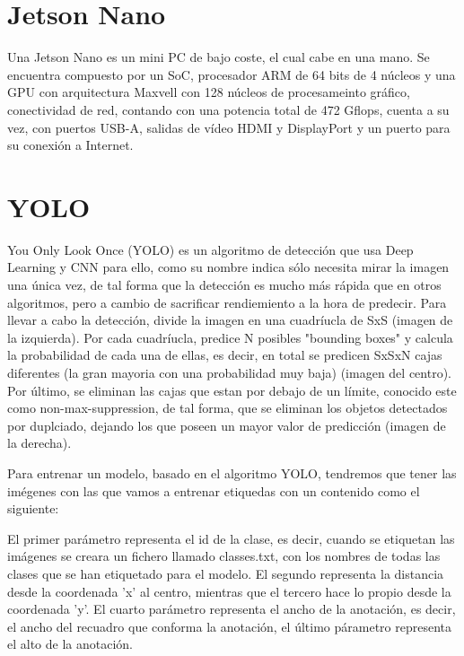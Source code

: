 
\section{Jetson Nano}

Una Jetson Nano \cite{jetsonNano} es un mini PC de bajo coste, el cual cabe en una mano. Se encuentra compuesto por un SoC, procesador ARM de 64 bits de 4 núcleos y una GPU con arquitectura Maxvell con 128 núcleos de procesameinto gráfico, conectividad de red, 
contando con una potencia total de 472 Gflops, cuenta a su vez, con puertos USB-A, salidas de vídeo HDMI y DisplayPort y un puerto para su conexión a Internet.


\section{YOLO}

You Only Look Once (YOLO) \cite{yolov4} es un algoritmo de detección que usa Deep Learning y CNN para ello, como su nombre indica sólo necesita mirar la imagen una única vez, de tal forma que la detección es mucho más rápida que en otros algoritmos, pero a cambio de sacrificar rendiemiento a la hora de predecir.
Para llevar a cabo la detección, divide la imagen en una cuadríucla de SxS (imagen de la izquierda). Por cada cuadríucla, predice N posibles "bounding boxes" y calcula la probabilidad de cada una de ellas, es decir, en total se predicen SxSxN cajas diferentes (la gran mayoria con una probabilidad muy baja) (imagen del centro). 
Por último, se eliminan las cajas que estan por debajo de un límite, conocido este como non-max-suppression, de tal forma, que se eliminan los objetos detectados por duplciado, dejando los que poseen un mayor valor de predicción (imagen de la derecha).


Para entrenar un modelo, basado en el algoritmo YOLO, tendremos que tener las imégenes con las que vamos a entrenar etiquedas con un contenido como el siguiente:


El primer parámetro representa el id de la clase, es decir, cuando se etiquetan las imágenes se creara un fichero llamado classes.txt, con los nombres de todas las clases que se han etiquetado para el modelo.
El segundo representa la distancia desde la coordenada 'x' al centro, mientras que el tercero hace lo propio desde la coordenada 'y'.
El cuarto parámetro representa el ancho de la anotación, es decir, el ancho del recuadro que conforma la anotación, el último párametro representa el alto de la anotación.


